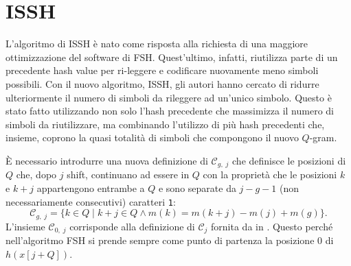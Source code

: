 \section{ISSH}
\label{sec:ISSH}

L'algoritmo di \ac{ISSH} \cite{petrucci2020issh} è nato come risposta alla richiesta di una maggiore ottimizzazione del software di \acs{FSH}. Quest'ultimo, infatti, riutilizza parte di un precedente hash value per ri-leggere e codificare nuovamente meno simboli possibili. Con il nuovo algoritmo, \acs{ISSH}, gli autori hanno cercato di ridurre ulteriormente il numero di simboli da rileggere ad un'unico simbolo. Questo è stato fatto utilizzando non solo l'hash precedente che massimizza il numero di simboli da riutilizzare, ma combinando l'utilizzo di più hash precedenti che, insieme, coprono la quasi totalità di simboli che compongono il nuovo $Q$-gram.

È necessario introdurre una nuova definizione di $\mathcal{C}_{g,\; j}$ che definisce le posizioni di $Q$ che, dopo $j$ shift, continuano ad essere in $Q$ con la proprietà che le posizioni $k$ e $k + j$ appartengono entrambe a $Q$ e sono separate da $j - g - 1$ (non necessariamente consecutivi) caratteri \texttt{1}: \[ \mathcal{C}_{g,\; j} = \{ k \in Q \;|\; k + j \in Q \wedge m(k) = m(k + j) - m(j) + m(g) \}. \] L'insieme $\mathcal{C}_{0,\; j}$ corrisponde alla definizione di $\mathcal{C}_j$ fornita da \citeauthor*{girotto2018fsh} in  \cite{girotto2018fsh}. Questo perché nell'algoritmo \acs{FSH} si prende sempre come punto di partenza la posizione $0$ di $h(x[j + Q])$.


